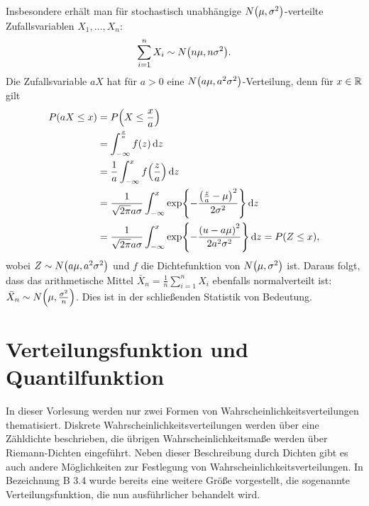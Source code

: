 \documentclass{lecture}
\begin{document}
\begin{example}
\begin{enumerate}
            Insbesondere erhält man für stochastisch unabhängige \(N\parentheses*{\mu, \sigma^2}\)-verteilte Zufallsvariablen \(X_1, \ldots, X_n\):
            \[
                \sum_{i = 1}^n X_i \sim N\parentheses*{n\mu, n\sigma^2}.
            \]
            Die Zufallsvariable \(aX\) hat für \(a > 0\) eine \(N\parentheses*{a\mu, a^2 \sigma^2}\)-Verteilung, denn für \(x \in \mathbb{R}\) gilt
            \begin{align*}
                P\parentheses*{aX \le x} &= P\parentheses*{X \le \frac{x}{a}}\\
                &= \int_{-\infty}^{\frac{x}{a}}f\parentheses*{z}\d z\\
                &= \frac{1}{a}\int_{-\infty}^x f\parentheses*{\frac{z}{a}}\d z\\
                &= \frac{1}{\sqrt{2\pi}a\sigma}\int_{-\infty}^x \exp\braces*{-\frac{\parentheses*{\frac{z}{a} - \mu}^2}{2\sigma^2}}\d z\\
                &= \frac{1}{\sqrt{2\pi}a\sigma}\int_{-\infty}^x \exp\braces*{-\frac{\parentheses*{u - a\mu}^2}{2a^2 \sigma^2}}\d z = P\parentheses*{Z \le x},
            \end{align*}
            wobei \(Z \sim N\parentheses*{a\mu, a^2 \sigma^2}\) und \(f\) die Dichtefunktion von \(N\parentheses*{\mu, \sigma^2}\) ist.
            Daraus folgt, dass das arithmetische Mittel \(\bar{X}_n = \frac{1}{n}\sum_{i = 1}^n X_i\) ebenfalls normalverteilt ist: \(\bar{X}_n \sim N\parentheses*{\mu, \frac{\sigma^2}{n}}\).
            Dies ist in der schließenden Statistik von Bedeutung.
        \end{enumerate}
    \end{example}


    \section*{Verteilungsfunktion und Quantilfunktion}

    In dieser Vorlesung werden nur zwei Formen von Wahrscheinlichkeitsverteilungen thematisiert.
    Diskrete Wahrscheinlichkeitsverteilungen werden über eine Zähldichte beschrieben, die übrigen Wahrscheinlichkeitsmaße werden über Riemann-Dichten eingeführt.
    Neben dieser Beschreibung durch Dichten gibt es auch andere Möglichkeiten zur Festlegung von Wahrscheinlichkeitsverteilungen. In Bezeichnung B 3.4 wurde bereits eine weitere Größe vorgestellt, die sogenannte Verteilungsfunktion, die nun ausführlicher behandelt wird.
\end{document}

